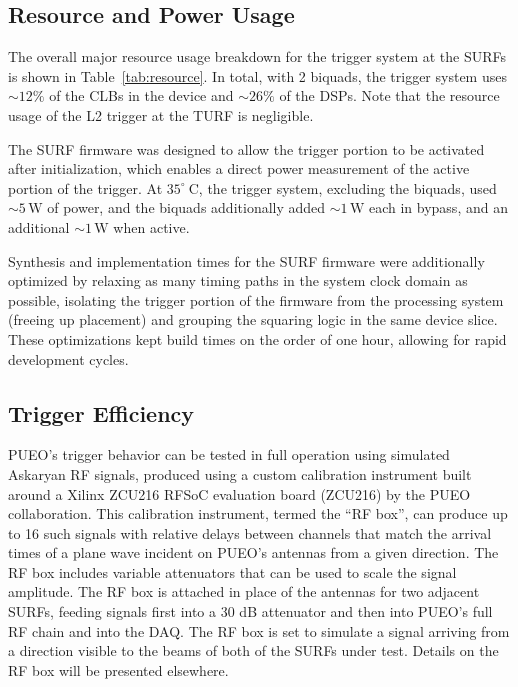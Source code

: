 \documentclass{IEEEtran}
\begin{document}
\subsection{Resource and Power Usage}
The overall major resource usage breakdown for the trigger system
at the SURFs is shown in Table~\ref{tab:resource}. In total, with 2 biquads,
the trigger system uses $\sim12\%$ of the CLBs in the device and $\sim26\%$
of the DSPs. Note that the resource usage of the L2 trigger at the TURF is
negligible.

The SURF firmware was designed to allow the trigger portion to be activated 
after initialization, which enables a direct power measurement of 
the active portion of the trigger. At
$35^{\circ}~\mathrm{C}$, the trigger system, excluding the biquads,
used $\sim 5\,\mathrm{W}$ of power, and the biquads additionally
added $\sim 1\,\mathrm{W}$ each in bypass, and an additional
$\sim1\,\mathrm{W}$ when active. 

Synthesis and implementation times for the SURF firmware were additionally
optimized by relaxing as many timing paths in the system clock domain as
possible, isolating the trigger portion of the firmware from the
processing system (freeing up placement) and grouping the squaring logic
in the same device slice. These optimizations kept build times on the order of
one hour, allowing for rapid development cycles.

\subsection{Trigger Efficiency}

PUEO's trigger behavior can be tested in full operation using simulated Askaryan RF signals, 
produced using a custom calibration instrument built around a Xilinx ZCU216 RFSoC evaluation board (ZCU216) by the PUEO collaboration. 
This calibration instrument, termed the ``RF box'', can produce up to 16 such signals with 
relative delays between channels that match the arrival times of a plane wave incident on 
PUEO's antennas from a given direction. The RF box includes variable attenuators that can be 
used to scale the signal amplitude. The RF box is attached in place of the antennas 
for two adjacent SURFs, feeding signals first into a 30 dB attenuator and then into PUEO's full RF chain 
and into the DAQ. The RF box is set to simulate a signal arriving from a direction visible to the 
beams of both of the SURFs under test. Details on the RF box will be presented elsewhere.
\end{document}
